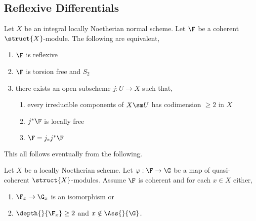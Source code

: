 \documentclass[12pt]{article}
\begin{document}
\subsection{Reflexive Differentials}

\begin{lemma}
Let $X$ be an integral locally Noetherian normal scheme. Let $\F$ be a coherent $\struct{X}$-module. The following are equivalent,
\begin{enumerate}
\item $\F$ is reflexive
\item $\F$ is torsion free and $S_2$
\item there exists an open subscheme $j : U \to X$ such that,
\begin{enumerate}
\item every irreducible components of $X \sm U$ has codimension $\ge 2$ in $X$
\item $j^* \F$ is locally free
\item $\F = j_* j^* \F$
\end{enumerate}
\end{enumerate}
\end{lemma}

This all follows eventually from the following.

\begin{lemma}
Let $X$ be a locally Noetherian scheme. Let $\varphi : \F \to \G$ be a map of quasi-coherent $\struct{X}$-modules. Assume $\F$ is coherent and for each $x \in X$ either,
\begin{enumerate}
\item $\F_x \to \G_x$ is an isomorphism or
\item $\depth{}{\F_x} \ge 2$ and $x \notin \Ass{}{\G}$.
\end{enumerate}
\end{lemma}
\end{document}
